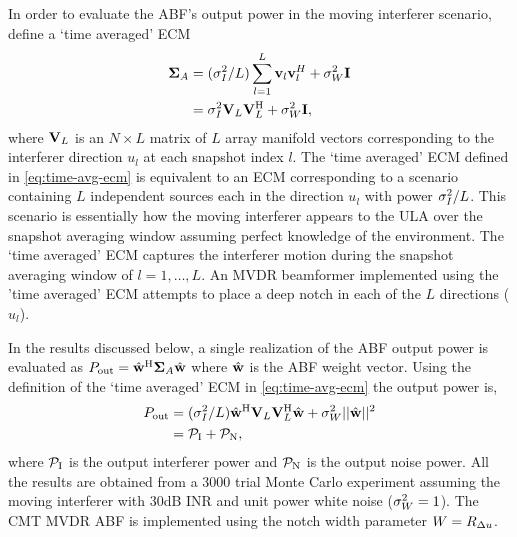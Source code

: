 In order to evaluate the ABF's output power in the moving interferer
scenario, define a `time averaged' ECM
\begin{align}
  \label{eq:time-avg-ecm}
  \boldsymbol{\Sigma}_A &= (\sigma_I^2/L)\sum_{l = 1}^{L}{\bf v}_l{\bf v}_l^H +
            \sigma^2_W{\bf I}  \nonumber \\ 
  &= \sigma_I^2{\bf V}_L{\bf V}_L^{\rm H} + \sigma^2_W{\bf I},
\end{align}
where ${\bf V}_L$ is an $N\times L$ matrix of $L$ array manifold
vectors corresponding to the interferer direction $u_l$ at each
snapshot index $l$. The `time averaged' ECM defined in
\eqref{eq:time-avg-ecm} is equivalent to an ECM corresponding to a
scenario containing $L$ independent sources each in the direction $u_l$
with power $\sigma_I^2/L$. This scenario is essentially how the moving
interferer appears to the ULA over the snapshot averaging window
assuming perfect knowledge of the environment. The `time averaged'
ECM captures the interferer motion during the snapshot averaging
window of $l = 1,\ldots, L$. An MVDR beamformer implemented using the
'time averaged' ECM attempts to place a deep notch in each of the $L$
directions ($u_l$).

In the results discussed below, a single realization of the ABF output
power is evaluated as $P_{\rm out} = \hat{{\bf w}}^{\rm H}\boldsymbol{\Sigma}_A\hat{{\bf w}}$ where
$\hat{{\bf w}}$ is the ABF weight vector. Using the definition of the `time
averaged' ECM in \eqref{eq:time-avg-ecm} the output power is,
\begin{align}
  \label{eq:time-avg-pout}
  P_{\rm out} &= (\sigma_I^2/L)\hat{{\bf w}}^{\rm H}{\bf V}_L{\bf V}_L^{\rm H}\hat{{\bf w}} + \sigma^2_W||\hat{{\bf w}}||^2 \nonumber \\
&= \mathcal{P}_{\rm I} + \mathcal{P}_{\rm N},
\end{align}
where $\mathcal{P}_{\rm I}$ is the output interferer power and $\mathcal{P}_{\rm N}$ is the
output noise power. All the results are obtained from a 3000 trial
Monte Carlo experiment assuming the moving interferer with $30$dB INR
and unit power white noise ($\sigma^2_W = 1$). The CMT MVDR ABF is
implemented using the notch width parameter $W = R_{\Delta u}$.


